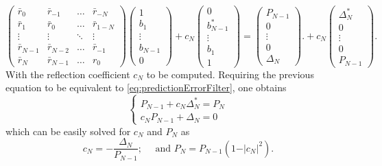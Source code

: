 \documentclass[twocolumn,showpacs,preprintnumbers,nofootinbib,prd,
superscriptaddress,10pt]{revtex4-1}
\begin{document}
\begin{equation}\nonumber 
        \begin{pmatrix}
    \bar r_0 & \bar r_{-1} & \dots & \bar r_{- N}\\
    \bar r_{1} & \bar r_0 & \dots & \bar r_{1 - N}\\ 
    \vdots & \vdots & \ddots & \vdots \\ 
    \bar r_{N -1} & \bar r_{N-2} & \dots &  \bar r_{-1}
    \\
    \bar r_{N } & \bar r_{N -1} & \dots  & r_0 
    \end{pmatrix} 
    \begin{pmatrix}
    1  \\   b_1  \\  \vdots \\   b_{N - 1} \\ 0 
    \end{pmatrix} 
    + c_N 
    \begin{pmatrix}
    0 \\ b^*_{N -1} \\ \vdots  \\ b_1 \\ 1 
    \end{pmatrix}
    =
    \begin{pmatrix}
    P_{N -1} \\  0 \\ \vdots \\ 0 \\ \Delta_N
    \end{pmatrix} .
    + c_N
    \begin{pmatrix}
    \Delta^*_N \\ 0 \\\vdots \\ 0 \\ P_{N-1}
    \end{pmatrix}.
\end{equation}
With the reflection coefficient $c_N$ to be computed. Requiring the previous equation to be equivalent to \ref{eq:predictionErrorFilter}, one obtains
\begin{equation}\nonumber 
\begin{cases}
    P_{N - 1} + c_N\Delta^*_N = P_N \\
    c_N P_{N - 1} + \Delta_N = 0
\end{cases}
\end{equation}
which can be easily solved for $c_N$ and $P_N$ as 
\begin{equation}
    c_N = -\frac{\Delta_N}{P_{N-1}}; \quad \text{ and } P_N = P_{N - 1}\left(1 - \vert c_N \vert ^2 \right). 
\end{equation}
\end{document}
